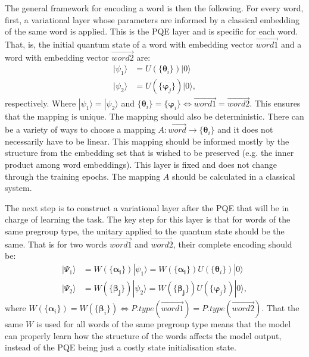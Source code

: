 The general framework for encoding a word is then the following. For every word, first, a variational layer whose parameters are informed by a classical embedding of the same word is applied. This is the PQE layer and is specific for each word. That, is, the initial quantum state of a word with embedding vector $\overrightarrow{word1}$ and a word with embedding vector $\overrightarrow{word2}$ are:
\begin{align}\label{eq:PQE}
    |\psi_1\rangle&=U(\{ \boldsymbol{\theta}_i \})|0\rangle \\
    |\psi_2\rangle&=U(\{ \boldsymbol{\varphi}_j \})|0\rangle,
\end{align}
respectively. Where $|\psi_1\rangle=|\psi_2\rangle$ and $\{\boldsymbol{\theta}_i\}=\{ \boldsymbol{\varphi}_i \} \iff \overrightarrow{word1}=\overrightarrow{word2}$. This ensures that the mapping is unique. The mapping should also be deterministic. There can be a variety of ways to choose a mapping $A:\overrightarrow{word}\rightarrow \{\boldsymbol{\theta}_i\}$ and it does not necessarily have to be linear. This mapping should be informed mostly by the structure from the embedding set that is wished to be preserved (e.g. the inner product among word embeddings). This layer is fixed and does not change through the training epochs. The mapping $A$ should be calculated in a classical system.

The next step is to construct a variational layer after the PQE that will be in charge of learning the task. The key step for this layer is that for words of the same pregroup type, the unitary applied to the quantum state should be the same. That is for two words $\overrightarrow{word1}$ and $\overrightarrow{word2}$, their complete encoding should be:
\begin{align*}
    |\Psi_1\rangle&=W(\{ \boldsymbol{\alpha_i} \})|\psi_1\rangle=W(\{ \boldsymbol{\alpha_i} \})U(\{ \boldsymbol{\theta}_i \})|0\rangle \\
    |\Psi_2\rangle&=W(\{ \boldsymbol{\beta_j} \})|\psi_2\rangle=W(\{ \boldsymbol{\beta_j} \})U(\{ \boldsymbol{\varphi}_j\})|0\rangle,
\end{align*}
where $W(\{\boldsymbol{\alpha}_i\})=W(\{ \boldsymbol{\beta}_i \}) \iff P.type(\overrightarrow{word1})=P.type(\overrightarrow{word2})$. That the same $W$ is used for all words of the same pregroup type means that the model can properly learn how the structure of the words affects the model output, instead of the PQE being just a costly state initialisation state.

